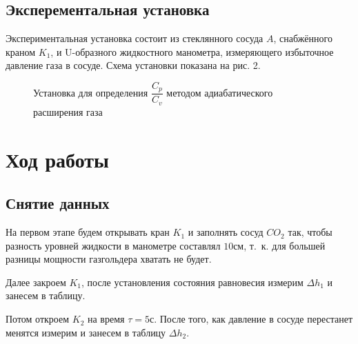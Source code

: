 \documentclass[a4paper,11.5pt]{article} %
\begin{document}
\subsection{Эксперементальная установка}

Экспериментальная установка состоит из стеклянного сосуда $A$, снабжённого краном $K_1$, и U-образного жидкостного манометра, измеряющего избыточное давление газа в сосуде. Схема установки показана на рис. 2.

\begin{figure}[!h]
	\caption{Установка для определения $\dfrac{C_p}{C_v}$ методом адиабатического расширения газа}
\end{figure}

\newpage

\section{Ход работы}

\subsection{Снятие данных}

На первом этапе будем открывать кран $K_1$ и заполнять сосуд $CO_2$ так, чтобы разность уровней жидкости в манометре составлял $10 \text{см}$, т.~к. для большей разницы мощности газгольдера хватать не будет.

Далее закроем $K_1$, после установления состояния равновесия измерим $\Delta h_1$ и занесем в таблицу.

Потом откроем $K_2$ на время $\tau = 5 \text{с}$. После того, как давление в сосуде перестанет менятся измерим и занесем в таблицу $\Delta h_2$.
\end{document}
